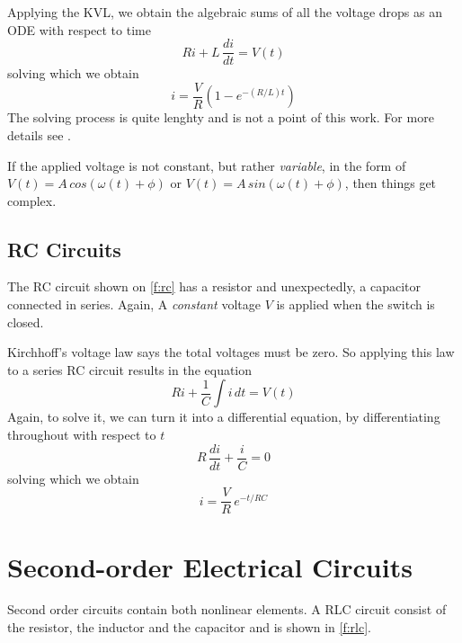 \documentclass[journal]{IEEEtran}
\begin{document}

Applying the KVL, we obtain the algebraic sums of all the voltage drops as an ODE with respect to time
$$Ri+L\,\frac{di}{dt}=V(t)$$
solving which we obtain 
$$i=\frac{V}{R}\left(1-e^{-(R/L)t}\right)$$
The solving process is quite lenghty and is not a point of this work. For more details see \cite{bird2014electrical}.

If the applied voltage is not constant, but rather \textit{variable}, in the form of $V(t)=A\,cos(\omega(t) + \phi)$ or $V(t)=A\,sin(\omega(t) + \phi)$, then things get complex.

\subsection{RC Circuits}
The RC circuit shown on \cref{f:rc} has a resistor and unexpectedly, a capacitor connected in series. Again, A \textit{constant} voltage $V$ is applied when the switch is closed.


Kirchhoff's voltage law says the total voltages must be zero. So applying this law to a series RC circuit results in the equation
$$Ri+\frac{1}{C}\int i\,dt=V(t)$$
Again, to solve it, we can turn it into a differential equation, by differentiating throughout with respect to $t$
$$R\,\frac{di}{dt}+\frac{i}{C}=0$$
solving which we obtain
$$i=\frac{V}{R}\,e^{-t/RC}$$





\section{Second-order Electrical Circuits}
Second order circuits contain both nonlinear elements. A RLC circuit consist of the resistor, the inductor and the capacitor and is shown in \cref{f:rlc}.

\end{document}
